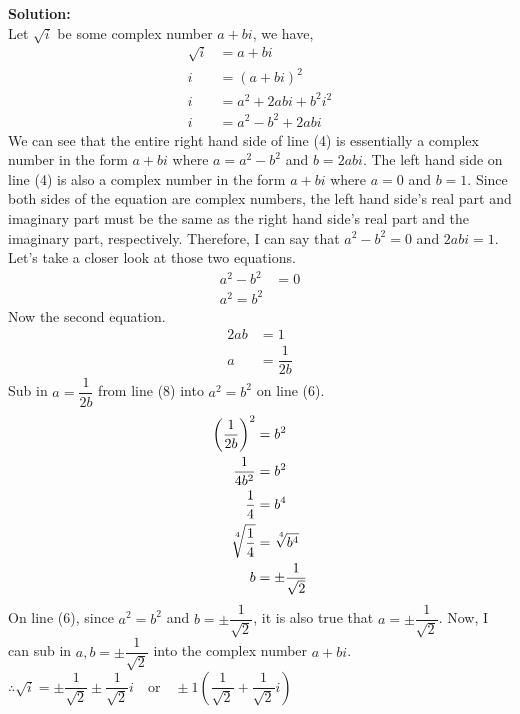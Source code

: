 \documentclass[12pt]{book}
\begin{document}
\begin{enumerate}
\begin{enumerate}
\textbf{Solution:}\\
Let $\sqrt{i}$ be some complex number $a + bi$, we have,
\setcounter{equation}{0}
\begin{align}
    \sqrt{i} &= a +bi\\
    i &= (a+bi)^2 \\
    i &= a^2 + 2abi + b^2i^2 \\
    i &= a^2 - b^2 + 2abi
\end{align}
We can see that the entire right hand side of line (4) is essentially a complex number in the form $a + bi$ where $a = a^2 - b^2$ and $b = 2abi$. The left hand side on line (4) is also a complex number in the form $a+bi$ where $a = 0$ and $b=1$. Since both sides of the equation are complex numbers, the left hand side's real part and imaginary part must be the same as the right hand side's real part and the imaginary part, respectively. Therefore, I can say that $a^2-b^2 = 0$ and $2abi = 1$. Let's take a closer look at those two equations.
\begin{align}
    a^2 - b^2 &= 0 \\
    a^2 = b^2 
\end{align}
Now the second equation.
\begin{align}
    2ab &= 1 \\
    a &= \dfrac{1}{2b}
\end{align}
Sub in $a = \dfrac{1}{2b}$ from line (8) into $a^2 = b^2$ on line (6).
\begin{align}
    \left(\dfrac{1}{2b}\right)^2 &= b^2 \\
    \dfrac{1}{4b^2} &= b^2 \\
    \dfrac{1}{4} &= b^4 \\
    \sqrt[\leftroot{-1}\uproot{4}4]{\dfrac{1}{4}} &= \sqrt[\leftroot{-1}\uproot{3}4]{b^4} \\
    b &= \pm \dfrac{1}{\sqrt{2}}
\end{align}
On line (6), since $a^2 = b^2$ and $b = \pm \dfrac{1}{\sqrt{2}}$, it is also true that $a = \pm \dfrac{1}{\sqrt{2}}$. Now, I can sub in $a, b = \pm \dfrac{1}{\sqrt{2}}$ into the complex number $a + bi$. \\
$\therefore \sqrt{i} = \pm \dfrac{1}{\sqrt{2}} \pm \dfrac{1}{\sqrt{2}}i \quad \text{or} \quad \pm 1 \left(\dfrac{1}{\sqrt{2}} + \dfrac{1}{\sqrt{2}} i \right)$


\end{enumerate}



\end{enumerate}
\end{document}
